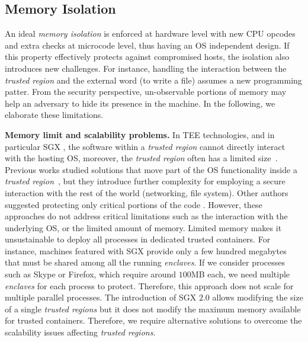 \subsection{Memory Isolation}

An ideal \emph{memory isolation} is enforced at hardware level with new CPU 
opcodes and extra checks at microcode level, thus having an OS independent 
design.
If this property effectively protects against compromised hosts, the isolation 
also introduces new challenges.
For instance, handling the interaction between the \emph{trusted region} and 
the external word (\eg to write a file) assumes a new programming patter.
From the security perspective, un-observable portions of memory may help an 
adversary to hide its presence in the machine.
In the following, we elaborate these limitations.

\vspace{0.5cm}
\noindent \textbf{Memory limit and scalability problems.}
In TEE technologies, and in particular SGX \citep{costan2016intel}, the 
software within a \emph{trusted region} cannot directly interact with the 
hosting OS, moreover, the \emph{trusted region} often has a limited 
size~\citep{baumann2015shielding}.
Previous works studied solutions that move part of the OS functionality inside 
a \emph{trusted 
region}~\citep{baumann2015shielding,arnautov2016scone,tsai2017graphene},
but they introduce further complexity for employing a secure interaction with 
the rest of the world (\eg networking, file system).
Other authors suggested protecting only critical portions of the 
code \citep{schuster2015vc3,lind2017glamdring}.
However, these approaches do not address critical limitations such as the 
interaction with the underlying OS, or the limited amount of memory.
Limited memory makes it unsustainable to deploy all processes in dedicated 
trusted containers.
For instance, machines featured with SGX provide only a few hundred megabytes 
that must be shared among all the running \emph{enclaves}.
If we consider processes such as Skype or Firefox, which require around 
$100$MB each, we need multiple \emph{enclaves} for each process to protect.
Therefore, this approach does not scale for multiple parallel processes.
The introduction of SGX $2.0$ allows modifying the size of a single 
\emph{trusted regions} but it does not modify the maximum memory available for 
trusted containers.
Therefore, we require alternative solutions to overcome the scalability issues 
affecting \emph{trusted regions}.

